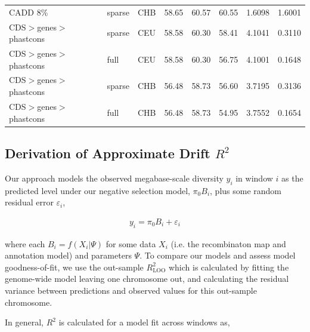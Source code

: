 \documentclass[11pt]{article}
\begin{document}
\begin{table}
\begin{tabular}{lll|crr|cc}
               CADD 8\% &            sparse &          CHB &                        58.65 &             60.57 &            60.55 &                                 1.6098 &                                1.6001 \\
CDS$>$genes$>$phastcons &            sparse &          CEU &                        58.58 &             60.30 &            58.41 &                                 4.1041 &                                0.3110 \\
CDS$>$genes$>$phastcons &              full &          CEU &                        58.58 &             60.30 &            56.75 &                                 4.1001 &                                0.1648 \\
CDS$>$genes$>$phastcons &            sparse &          CHB &                        56.48 &             58.73 &            56.60 &                                 3.7195 &                                0.3136 \\
CDS$>$genes$>$phastcons &              full &          CHB &                        56.48 &             58.73 &            54.95 &                                 3.7552 &                                0.1654 \\
\hline
\end{tabular}
\end{table}


\subsection{Derivation of Approximate Drift $R^2$}

Our approach models the observed megabase-scale diversity $y_i$ in window $i$
as the predicted level under our negative selection model, $\pi_0 B_i$, plus
some random residual error $\varepsilon_i$,

\begin{align}
    y_i = \pi_0 B_i + \varepsilon_i
\end{align}

where each $B_i = f(X_i | \Psi)$ for some data $X_i$ (i.e. the recombinaton map
and annotation model) and parameters $\Psi$. To compare our models and assess
model goodness-of-fit, we use the out-sample $R_\text{LOO}^2$ which is
calculated by fitting the genome-wide model leaving one chromosome out, and
calculating the residual variance between predictions and observed values for
this out-sample chromosome. 

In general, $R^2$ is calculated for a model fit across windows as,
\end{document}
